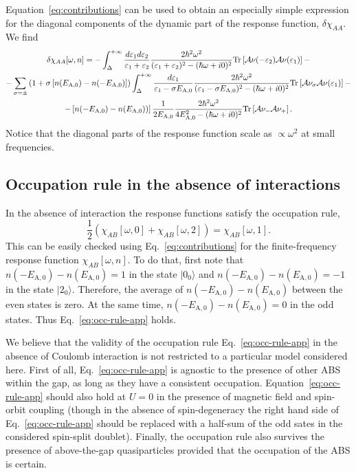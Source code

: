 \documentclass[aps,reprint,longbibliography, prb]{revtex4-2}
\begin{document}
Equation~\eqref{eq:contributions} can be used to obtain an especially simple expression for the diagonal components of the dynamic part of the response function, $\delta\chi_{AA}$. We find
\begin{gather}
\notag
\delta \chi_{AA}[\omega, n] = -\int_{\Delta}^{+\infty}\frac{d\varepsilon_{1}d\varepsilon_{2}}{\varepsilon_1 + \varepsilon_2}\frac{2\hbar^2\omega^2}{(\varepsilon_{1}+\varepsilon_{2})^2-(\hbar\omega+i0)^2}\mathrm{Tr}\left[{\cal A}\nu(-\varepsilon_{2}){\cal A}\nu(\varepsilon_{1})\right]-\\
-\sum_{\sigma=\pm}\left(1+\sigma\left[n(E_{\rm A,0})-n(-E_{\rm A,0})\right]\right)\int_{\Delta}^{+\infty}\frac{d\varepsilon_1}{\varepsilon_1 - \sigma E_{\mathrm{A,0}}}\frac{2\hbar^2\omega^2}{(\varepsilon_{1}-\sigma E_{\rm A,0})^2-(\hbar\omega+i0)^2}\mathrm{Tr}\left[{\cal A}\nu_{\sigma}{\cal A}\nu(\varepsilon_{1})\right]-\\
\notag
-\left[n(-E_{\rm A,0})-n(E_{\rm A,0}))\right]\frac{1}{2E_{\mathrm{A,0}}}\frac{2\hbar^2\omega^2}{4E_\mathrm{A,0}^2 - (\hbar\omega+i0)^2}\mathrm{Tr}\left[{\cal A}\nu_-{\cal A}\nu_+\right].
\end{gather}
Notice that the diagonal parts of the response function scale as $\propto \omega^2$ at small frequencies.

\subsection{Occupation rule in the absence of interactions}
In the absence of interaction the response functions satisfy the occupation rule,
\begin{equation}
    \label{eq:occ-rule-app}
    \frac{1}{2}\left(\chi_{AB}[\omega, 0] + \chi_{AB}[\omega, 2]\right) = \chi_{AB}[\omega, 1].
\end{equation}
This can be easily checked using Eq.~\eqref{eq:contributions} for the finite-frequency response function $\chi_{AB}[\omega, n]$. To do that, first note that $n(-E_\mathrm{A,0})-n(E_\mathrm{A,0}) = 1$ in the state $|0_0\rangle$ and $n(-E_\mathrm{A,0})-n(E_\mathrm{A,0}) = -1$ in the state $|2_0\rangle$. Therefore, the average of $n(-E_\mathrm{A,0})-n(E_\mathrm{A,0})$ between the even states is zero. At the same time, $n(-E_\mathrm{A,0}) - n(E_\mathrm{A,0}) = 0$ in the odd states. Thus Eq.~\eqref{eq:occ-rule-app} holds.

We believe that the validity of the occupation rule Eq.~\eqref{eq:occ-rule-app} in the absence of Coulomb interaction is not restricted to a particular model considered here. First of all, Eq.~\eqref{eq:occ-rule-app} is agnostic to the presence of other ABS within the gap, as long as they have a consistent occupation. Equation~\eqref{eq:occ-rule-app} should also hold at $U=0$ in the presence of magnetic field and spin-orbit coupling (though in the absence of spin-degeneracy the right hand side of Eq.~\eqref{eq:occ-rule-app} should be replaced with a half-sum of the odd sates in the considered spin-split doublet). Finally, the occupation rule also survives the presence of above-the-gap quasiparticles provided that the occupation of the ABS is certain.
\end{document}

